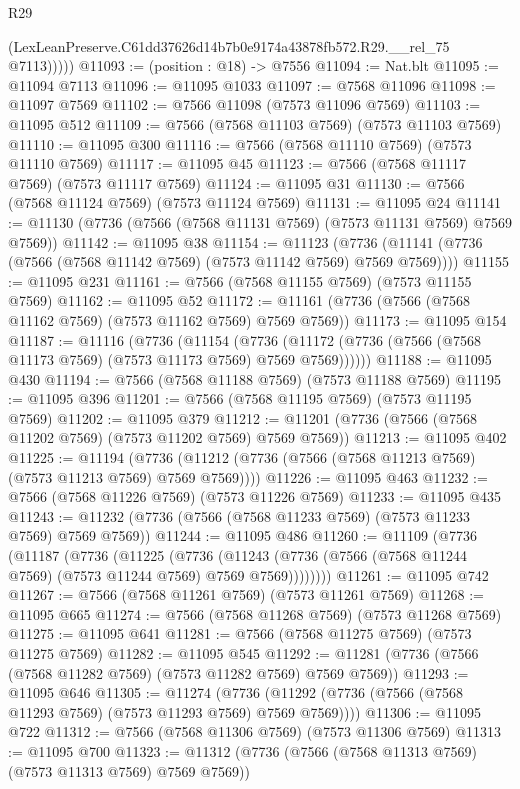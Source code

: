 \begin{lexlean}{R29}
\begin{coremodule}
            (LexLeanPreserve.C61dd37626d14b7b0e9174a43878fb572.R29.__rel_75 @7113)))))
@11093 := (position : @18) -> @7556
@11094 := Nat.blt
@11095 := @11094 @7113
@11096 := @11095 @1033
@11097 := @7568 @11096
@11098 := @11097 @7569
@11102 := @7566 @11098 (@7573 @11096 @7569)
@11103 := @11095 @512
@11109 := @7566 (@7568 @11103 @7569) (@7573 @11103 @7569)
@11110 := @11095 @300
@11116 := @7566 (@7568 @11110 @7569) (@7573 @11110 @7569)
@11117 := @11095 @45
@11123 := @7566 (@7568 @11117 @7569) (@7573 @11117 @7569)
@11124 := @11095 @31
@11130 := @7566 (@7568 @11124 @7569) (@7573 @11124 @7569)
@11131 := @11095 @24
@11141 := @11130 (@7736 (@7566 (@7568 @11131 @7569) (@7573 @11131 @7569) @7569 @7569))
@11142 := @11095 @38
@11154 := @11123
    (@7736 (@11141 (@7736 (@7566 (@7568 @11142 @7569) (@7573 @11142 @7569) @7569 @7569))))
@11155 := @11095 @231
@11161 := @7566 (@7568 @11155 @7569) (@7573 @11155 @7569)
@11162 := @11095 @52
@11172 := @11161 (@7736 (@7566 (@7568 @11162 @7569) (@7573 @11162 @7569) @7569 @7569))
@11173 := @11095 @154
@11187 := @11116
    (@7736
      (@11154
        (@7736 (@11172 (@7736 (@7566 (@7568 @11173 @7569) (@7573 @11173 @7569) @7569 @7569))))))
@11188 := @11095 @430
@11194 := @7566 (@7568 @11188 @7569) (@7573 @11188 @7569)
@11195 := @11095 @396
@11201 := @7566 (@7568 @11195 @7569) (@7573 @11195 @7569)
@11202 := @11095 @379
@11212 := @11201 (@7736 (@7566 (@7568 @11202 @7569) (@7573 @11202 @7569) @7569 @7569))
@11213 := @11095 @402
@11225 := @11194
    (@7736 (@11212 (@7736 (@7566 (@7568 @11213 @7569) (@7573 @11213 @7569) @7569 @7569))))
@11226 := @11095 @463
@11232 := @7566 (@7568 @11226 @7569) (@7573 @11226 @7569)
@11233 := @11095 @435
@11243 := @11232 (@7736 (@7566 (@7568 @11233 @7569) (@7573 @11233 @7569) @7569 @7569))
@11244 := @11095 @486
@11260 := @11109
    (@7736
      (@11187
        (@7736
          (@11225
            (@7736
              (@11243 (@7736 (@7566 (@7568 @11244 @7569) (@7573 @11244 @7569) @7569 @7569))))))))
@11261 := @11095 @742
@11267 := @7566 (@7568 @11261 @7569) (@7573 @11261 @7569)
@11268 := @11095 @665
@11274 := @7566 (@7568 @11268 @7569) (@7573 @11268 @7569)
@11275 := @11095 @641
@11281 := @7566 (@7568 @11275 @7569) (@7573 @11275 @7569)
@11282 := @11095 @545
@11292 := @11281 (@7736 (@7566 (@7568 @11282 @7569) (@7573 @11282 @7569) @7569 @7569))
@11293 := @11095 @646
@11305 := @11274
    (@7736 (@11292 (@7736 (@7566 (@7568 @11293 @7569) (@7573 @11293 @7569) @7569 @7569))))
@11306 := @11095 @722
@11312 := @7566 (@7568 @11306 @7569) (@7573 @11306 @7569)
@11313 := @11095 @700
@11323 := @11312 (@7736 (@7566 (@7568 @11313 @7569) (@7573 @11313 @7569) @7569 @7569))

\end{coremodule}
\end{lexlean}
